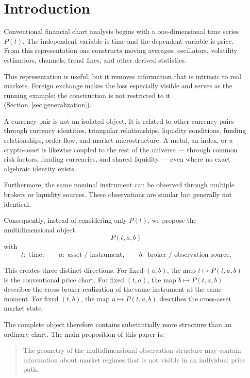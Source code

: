 \documentclass[11pt,a4paper]{article}
\numberwithin{equation}{section}
\begin{document}
\tableofcontents

\newpage

\section{Introduction}

Conventional financial chart analysis begins with a one-dimensional
time series $P(t)$. The independent variable is time and the
dependent variable is price. From this representation one constructs
moving averages, oscillators, volatility estimators, channels, trend
lines, and other derived statistics.

This representation is useful, but it removes information that is
intrinsic to real markets. Foreign exchange makes the loss
especially visible and serves as the running example; the
construction is not restricted to it
(Section~\ref{sec:generalization}).

A currency pair is not an isolated object. It is related to other
currency pairs through currency identities, triangular
relationships, liquidity conditions, funding relationships, order
flow, and market microstructure. A metal, an index, or a
crypto-asset is likewise coupled to the rest of the universe ---
through common risk factors, funding currencies, and shared
liquidity --- even where no exact algebraic identity exists.

Furthermore, the same nominal instrument can be observed through
multiple brokers or liquidity sources. These observations are
similar but generally not identical.

Consequently, instead of considering only $P(t)$, we propose the
multidimensional object
\[
\boxed{P(t,a,b)}
\]
with
\[
t:\text{ time},\qquad
a:\text{ asset / instrument},\qquad
b:\text{ broker / observation source}.
\]

This creates three distinct directions. For fixed $(a,b)$, the map
$t\mapsto P(t,a,b)$ is the conventional price chart. For fixed
$(t,a)$, the map $b\mapsto P(t,a,b)$ describes the cross-broker
realization of the same instrument at the same moment. For fixed
$(t,b)$, the map $a\mapsto P(t,a,b)$ describes the cross-asset
market state.

The complete object therefore contains substantially more structure
than an ordinary chart. The main proposition of this paper is:

\begin{quote}
The geometry of the multidimensional observation structure may
contain information about market regimes that is not visible in an
individual price path.
\end{quote}
\end{document}
